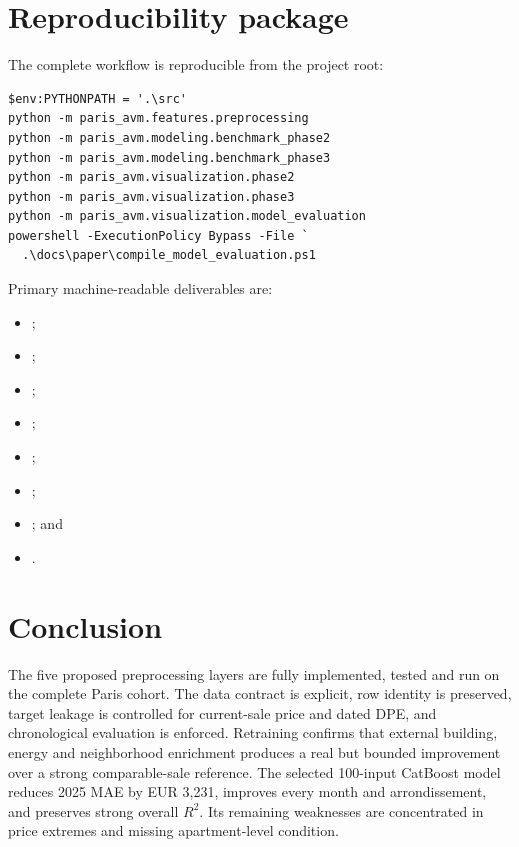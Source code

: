 \documentclass[11pt,a4paper]{article}
\begin{document}
\section{Reproducibility package}

The complete workflow is reproducible from the project root:
\begin{verbatim}
$env:PYTHONPATH = '.\src'
python -m paris_avm.features.preprocessing
python -m paris_avm.modeling.benchmark_phase2
python -m paris_avm.modeling.benchmark_phase3
python -m paris_avm.visualization.phase2
python -m paris_avm.visualization.phase3
python -m paris_avm.visualization.model_evaluation
powershell -ExecutionPolicy Bypass -File `
  .\docs\paper\compile_model_evaluation.ps1
\end{verbatim}

Primary machine-readable deliverables are:
\begin{itemize}[leftmargin=1.5em]
  \item {};
  \item {};
  \item {};
  \item {};
  \item {};
  \item {};
  \item {}; and
  \item {}.
\end{itemize}

\section{Conclusion}

The five proposed preprocessing layers are fully implemented, tested and run
on the complete Paris cohort. The data contract is explicit, row identity is
preserved, target leakage is controlled for current-sale price and dated DPE,
and chronological evaluation is enforced. Retraining confirms that external
building, energy and neighborhood enrichment produces a real but bounded
improvement over a strong comparable-sale reference. The selected 100-input
CatBoost model reduces 2025 MAE by EUR 3,231, improves every month and
arrondissement, and preserves strong overall $R^2$. Its remaining weaknesses
are concentrated in price extremes and missing apartment-level condition.
\end{document}
